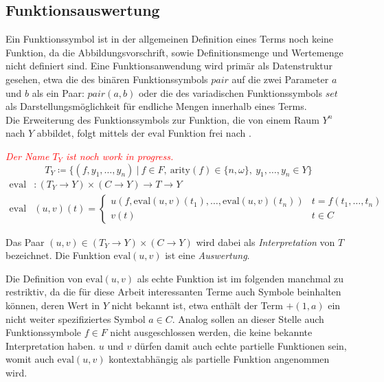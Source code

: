 \documentclass{article}
\begin{document}
\subsection{Funktionsauswertung}
Ein Funktionssymbol ist in der allgemeinen Definition eines Terms noch keine Funktion, da die Abbildungsvorschrift, sowie Definitionsmenge und Wertemenge nicht definiert sind. Eine Funktionsanwendung wird primär als Datenstruktur gesehen, etwa die des binären Funktionssymbols $pair$ auf die zwei Parameter $a$ und $b$ als ein Paar: $pair(a, b)$ oder die des variadischen Funktionssymbols $set$ als Darstellungsmöglichkeit für endliche Mengen innerhalb eines Terms.\\
Die Erweiterung des Funktionssymbols zur Funktion, die von einem Raum $Y^n$ nach $Y$ abbildet, folgt mittels der $\mathrm{eval}$ Funktion frei nach \cite{buch1977}.

\textcolor{red}{\textit{Der Name $T_Y$ ist noch work in progress.}}
$$T_Y \coloneqq \{(f, y_1, \dots, y_n)~|~f \in F,~\mathrm{arity}(f) \in \{n, \omega\},
~ y_1, \dots,y_n \in Y\}$$
\begin{equation*}
    \begin{split}
	\mathrm{eval} &\colon (T_Y \rightarrow Y) \times (C \rightarrow Y) \rightarrow T \rightarrow Y\\
	\mathrm{eval} &(u, v)(t) = \begin{cases}
		u(f, \mathrm{eval}(u, v)(t_1), \dots, \mathrm{eval}(u, v)(t_n)) & t = f(t_1, \dots, t_n)\\
		v(t)                                                                                            & t \in C
		\end{cases}
    \end{split}
\end{equation*}

Das Paar $(u, v) \in (T_Y \rightarrow Y) \times (C \rightarrow Y)$ wird dabei als \emph{Interpretation} von $T$ bezeichnet. Die Funktion $\mathrm{eval}(u, v)$ ist eine \emph{Auswertung}. 

Die Definition von $\mathrm{eval}(u, v)$ als echte Funktion ist im folgenden manchmal zu restriktiv, da die für diese Arbeit interessanten Terme auch Symbole beinhalten können, deren Wert in $Y$ nicht bekannt ist, etwa enthält der Term $+(1, a)$ ein nicht weiter spezifiziertes Symbol $a \in C$. Analog sollen an dieser Stelle auch Funktionssymbole $f \in F$ nicht ausgeschlossen werden, die keine bekannte Interpretation haben. $u$ und $v$ dürfen damit auch echte partielle Funktionen sein, womit auch $\mathrm{eval}(u, v)$ kontextabhängig als partielle Funktion angenommen wird.
\\~\\
\end{document}
